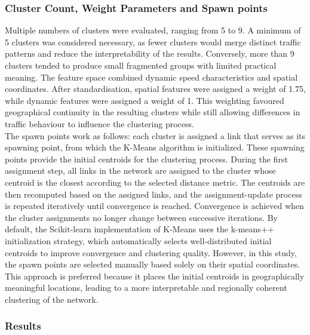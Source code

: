 \documentclass[11pt,a4paper]{article}
\begin{document}
\subsubsection{Cluster Count, Weight Parameters and Spawn points}
\label{sec:methods:kselect1}
Multiple numbers of clusters were evaluated, ranging from 5 to 9. A minimum of 5 clusters was considered necessary, as fewer clusters would merge distinct traffic patterns and reduce the interpretability of the results. Conversely, more than 9 clusters tended to produce small fragmented groups with limited practical meaning. The feature space combined dynamic speed characteristics and spatial coordinates. After standardisation, spatial features were assigned a weight of 1.75, while dynamic features were assigned a weight of 1. This weighting favoured geographical continuity in the resulting clusters while still allowing differences in traffic behaviour to influence the clustering process.\\
The spawn points work as follows: each cluster is assigned a link that serves as its spawning point, from which the K-Means algorithm is initialized. These spawning points provide the initial centroids for the clustering process. During the first assignment step, all links in the network are assigned to the cluster whose centroid is the closest according to the selected distance metric. The centroids are then recomputed based on the assigned links, and the assignment-update process is repeated iteratively until convergence is reached. Convergence is achieved when the cluster assignments no longer change between successive iterations. By default, the Scikit-learn implementation of K-Means uses the k-means++ initialization strategy, which automatically selects well-distributed initial centroids to improve convergence and clustering quality. However, in this study, the spawn points are selected manually based solely on their spatial coordinates. This approach is preferred because it places the initial centroids in geographically meaningful locations, leading to a more interpretable and regionally coherent clustering of the network.

\subsubsection{Results}
\label{sec:methods:results_km1}
\end{document}
